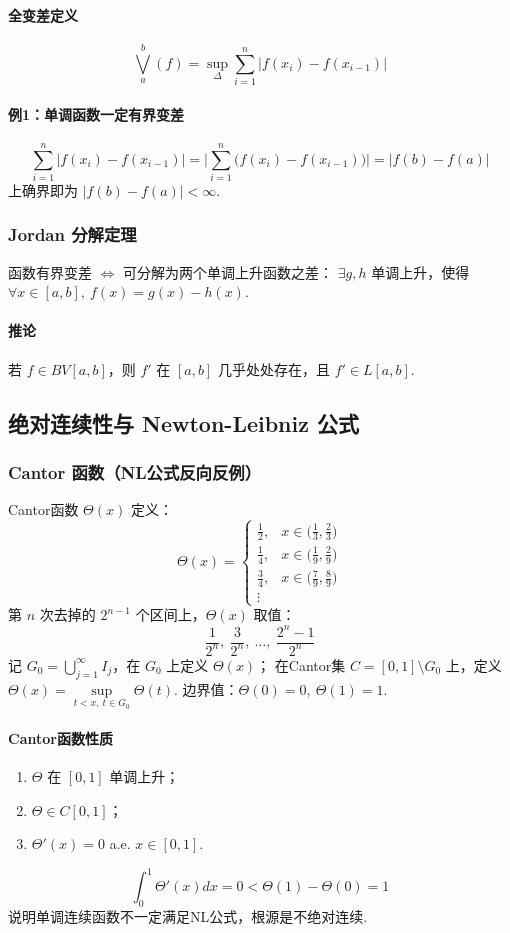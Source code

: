 \documentclass{article}
\begin{document}
	\paragraph{全变差定义}
	\[
	\displaystyle \bigvee_a^b (f)
	= \sup_{\Delta} \sum_{i=1}^n |f(x_i)-f(x_{i-1})|
	\]
	
	\paragraph{例1：单调函数一定有界变差}
	\[
	\sum_{i=1}^n |f(x_i)-f(x_{i-1})|
	= \Big|\sum_{i=1}^n \big(f(x_i)-f(x_{i-1})\big)\Big|
	= |f(b)-f(a)|
	\]
	上确界即为 $|f(b)-f(a)|<\infty$.
	
	\subsubsection{Jordan 分解定理}
	函数有界变差 $\iff$ 可分解为两个单调上升函数之差：
	$\exists g,h$ 单调上升，使得 $\forall x\in[a,b],\ f(x)=g(x)-h(x)$.
	
	\paragraph{推论}
	若 $f\in BV[a,b]$，则 $f'$ 在 $[a,b]$ 几乎处处存在，且 $f'\in L[a,b]$.
	
	\subsection{绝对连续性与 Newton-Leibniz 公式}
	\subsubsection{Cantor 函数（NL公式反向反例）}
	Cantor函数 $\Theta(x)$ 定义：
	\[
	\Theta(x)=
	\begin{cases}
		\frac12, & x\in \big(\tfrac13,\tfrac23\big)\\
		\frac14, & x\in \big(\tfrac19,\tfrac29\big)\\
		\frac34, & x\in \big(\tfrac79,\tfrac89\big)\\
		\vdots
	\end{cases}
	\]
	第 $n$ 次去掉的 $2^{n-1}$ 个区间上，$\Theta(x)$ 取值：
	\[
	\frac{1}{2^n},\ \frac{3}{2^n},\ \dots,\ \frac{2^n-1}{2^n}
	\]
	记 $G_0 = \bigcup_{j=1}^\infty I_j$，在 $G_0$ 上定义 $\Theta(x)$；
	在Cantor集 $C=[0,1]\setminus G_0$ 上，定义 $\Theta(x) = \sup\limits_{t<x,\ t\in G_0}\Theta(t)$.
	边界值：$\Theta(0)=0,\ \Theta(1)=1$.
	
	\paragraph{Cantor函数性质}
	\begin{enumerate}
		\item $\Theta$ 在 $[0,1]$ 单调上升；
		\item $\Theta\in C[0,1]$；
		\item $\Theta'(x)=0$ a.e. $x\in[0,1]$.
	\end{enumerate}
	\[
	\displaystyle \int_0^1 \Theta'(x)dx = 0 < \Theta(1)-\Theta(0)=1
	\]
	说明单调连续函数不一定满足NL公式，根源是不绝对连续.
	
\end{document}

